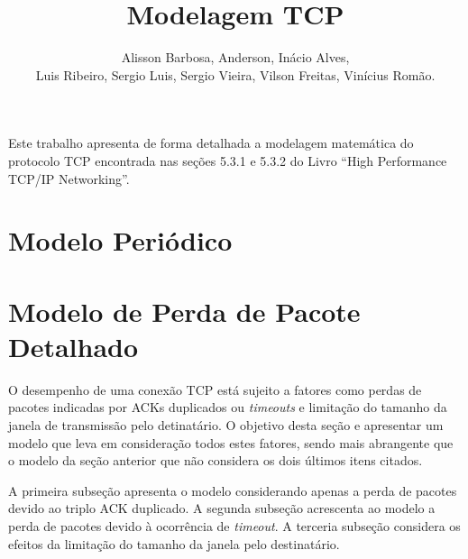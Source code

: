 \documentclass[12pt]{article}
\title{Modelagem TCP}
\author{Alisson Barbosa, Anderson, Inácio Alves, \\ 
  Luis Ribeiro, Sergio Luis, Sergio Vieira, Vilson Freitas, 
  Vinícius Romão.}
\begin{document}
 

\maketitle

     
\begin{resumo} 
  Este trabalho apresenta de forma detalhada a modelagem matemática do protocolo
  TCP encontrada nas seções 5.3.1 e 5.3.2 do Livro ``High Performance TCP/IP Networking''.
\end{resumo}


\section{Modelo Periódico}



\section{Modelo de Perda de Pacote Detalhado}
O desempenho de uma conexão TCP está sujeito a fatores como perdas de pacotes indicadas por 
ACKs duplicados ou \textit{timeouts} e limitação do tamanho da janela de transmissão pelo 
detinatário. O objetivo desta seção e apresentar um modelo que leva em consideração todos 
estes fatores, sendo mais abrangente que o modelo da seção anterior que não considera os dois
últimos itens citados.

A primeira subseção apresenta o modelo considerando apenas a perda de pacotes devido ao 
triplo ACK duplicado. A segunda subseção acrescenta ao modelo a perda de pacotes devido à
ocorrência de \textit{timeout}. A terceria subseção considera os efeitos da limitação do 
tamanho da janela pelo destinatário.



\end{document}
